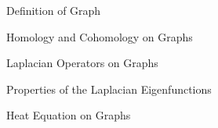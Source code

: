 \documentclass[../main.tex]{subfiles}
\begin{document}
    \begin{section}{Definition of Graph}
           
    \end{section}
    \begin{section}{Homology and Cohomology on Graphs}
        
    \end{section}
    \begin{section}{Laplacian Operators on Graphs}
        
    \end{section}
    \begin{section}{Properties of the Laplacian Eigenfunctions}
        
    \end{section}
    \begin{section}{Heat Equation on Graphs}
        
    \end{section}
\end{document}
